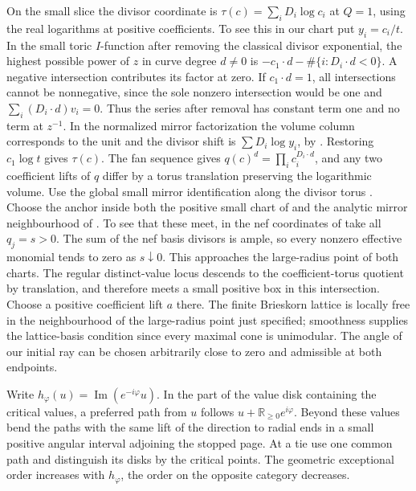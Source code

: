 On the small slice the divisor coordinate is $\tau(c)=\sum_i D_i\log c_i$ at $Q=1$, using the real logarithms at positive coefficients. To see this in our chart put $y_i=c_i/t$. In the small toric $I$-function after removing the classical divisor exponential, the highest possible power of $z$ in curve degree $d\ne0$ is $-c_1\cdot d-\#\{i:D_i\cdot d<0\}$. A negative intersection contributes its factor at zero. If $c_1\cdot d=1$, all intersections cannot be nonnegative, since the sole nonzero intersection would be one and $\sum_i(D_i\cdot d)v_i=0$. Thus the series after removal has constant term one and no term at $z^{-1}$. In the normalized mirror factorization the volume column corresponds to the unit and the divisor shift is $\sum D_i\log y_i$, by \cite[Lemma~4.32 and (4.14)--(4.15)]{CCIT}. Restoring $c_1\log t$ gives $\tau(c)$. The fan sequence gives $q(c)^d=\prod_i c_i^{D_i\cdot d}$, and any two coefficient lifts of $q$ differ by a torus translation preserving the logarithmic volume. Use the global small mirror identification along the divisor torus \cite[\S7.3]{GHIKLS}. Choose the anchor inside both the positive small chart of \cite{FZ} and the analytic mirror neighbourhood of \cite[Proposition~6.15, 6.16(2), and (6.11)]{IriGlobal}. To see that these meet, in the nef coordinates of \cite[\S3.1]{FZ} take all $q_j=s>0$. The sum of the nef basis divisors is ample, so every nonzero effective monomial tends to zero as $s\downarrow0$. This approaches the large-radius point of both charts. The regular distinct-value locus descends to the coefficient-torus quotient by translation, and therefore meets a small positive box in this intersection. Choose a positive coefficient lift $a$ there. The finite Brieskorn lattice is locally free in the neighbourhood of the large-radius point just specified; smoothness supplies the lattice-basis condition since every maximal cone is unimodular. The angle of our initial ray can be chosen arbitrarily close to zero and admissible at both endpoints.

Write $h_\varphi(u)=\operatorname{Im}(e^{-i\varphi}u)$. In the part of the value disk containing the critical values, a preferred path from $u$ follows $u+\mathbb R_{\ge0} e^{i\varphi}$. Beyond these values bend the paths with the same lift of the direction to radial ends in a small positive angular interval adjoining the stopped page. At a tie use one common path and distinguish its disks by the critical points. The geometric exceptional order increases with $h_\varphi$, the order on the opposite category decreases.

